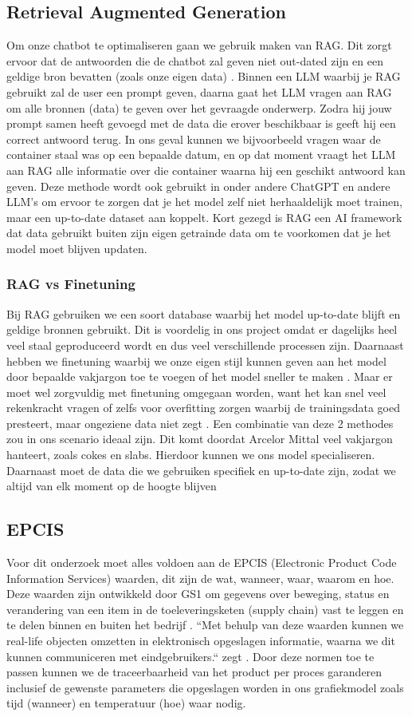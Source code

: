 \subsection{Retrieval Augmented Generation}
Om onze chatbot te optimaliseren gaan we gebruik maken van RAG.
Dit zorgt ervoor dat de antwoorden die de chatbot zal geven niet out-dated zijn en een geldige bron bevatten (zoals onze eigen data) \autocite{IBM2023}.
Binnen een LLM waarbij je RAG gebruikt zal de user een prompt geven, daarna gaat het LLM vragen aan RAG om alle bronnen (data) te geven over het gevraagde onderwerp.
Zodra hij jouw prompt samen heeft gevoegd met de data die erover beschikbaar is geeft hij een correct antwoord terug.
In ons geval kunnen we bijvoorbeeld vragen waar de container staal was op een bepaalde datum, en op dat moment vraagt het LLM aan RAG alle informatie over die container waarna hij een geschikt antwoord kan geven.
Deze methode wordt ook gebruikt in onder andere ChatGPT en andere LLM's om ervoor te zorgen dat je het model zelf niet herhaaldelijk moet trainen, maar een up-to-date dataset aan koppelt.
Kort gezegd is RAG een AI framework dat data gebruikt buiten zijn eigen getrainde data om te voorkomen dat je het model moet blijven updaten.
\subsubsection{RAG vs Finetuning}
Bij RAG gebruiken we een soort database waarbij het model up-to-date blijft en geldige bronnen gebruikt. Dit is voordelig in ons project omdat er dagelijks heel veel staal geproduceerd wordt en dus veel verschillende processen zijn.
Daarnaast hebben we finetuning waarbij we onze eigen stijl kunnen geven aan het model door bepaalde vakjargon toe te voegen of het model sneller te maken \autocite{IBM2024}.
Maar er moet wel zorgvuldig met finetuning omgegaan worden, want het kan snel veel rekenkracht vragen of zelfs voor overfitting zorgen waarbij de trainingsdata goed presteert, maar ongeziene data niet zegt \textcite{EASIIO2022}.
Een combinatie van deze 2 methodes zou in ons scenario ideaal zijn. Dit komt doordat Arcelor Mittal veel vakjargon hanteert, zoals cokes en slabs. Hierdoor kunnen we ons model specialiseren. Daarnaast moet de data die we gebruiken specifiek en up-to-date zijn, zodat we altijd van elk moment op de hoogte blijven

\subsection{EPCIS}
Voor dit onderzoek moet alles voldoen aan de EPCIS (Electronic Product Code Information Services) waarden, dit zijn de wat, wanneer, waar, waarom en hoe. 
Deze waarden zijn ontwikkeld door GS1 om gegevens over beweging, status en verandering van een item in de toeleveringsketen (supply chain) vast te leggen en te delen binnen en buiten het bedrijf \autocite{Devins}.
``Met behulp van deze waarden kunnen we real-life objecten omzetten in elektronisch opgeslagen informatie, waarna we dit kunnen communiceren met eindgebruikers.`` zegt \textcite{Devins}.
Door deze normen toe te passen kunnen we de traceerbaarheid van het product per proces garanderen inclusief de gewenste parameters die opgeslagen worden in ons grafiekmodel zoals tijd (wanneer) en temperatuur (hoe) waar nodig.
